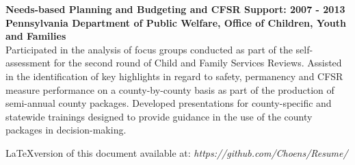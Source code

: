 \documentclass[line, margin, 10pt]{res}
\begin{document}
\begin{resume}
  {\bf Needs-based Planning and Budgeting and CFSR Support: 2007 - 2013} \\
  {\bf Pennsylvania Department of Public Welfare, Office of Children,
    Youth and Families} \\
  Participated in the analysis of focus groups conducted as part of
  the self-assessment for the second round of Child and Family
  Services Reviews.  Assisted in the identification of key highlights
  in regard to safety, permanency and CFSR measure performance on a
  county-by-county basis as part of the production of semi-annual
  county packages.  Developed presentations for county-specific and
  statewide trainings designed to provide guidance in the use of the
  county packages in decision-making.

  \vspace{1in}
  \LaTeX version of this document available at: \emph{https://github.com/Choens/Resume/}

\end{resume}
\end{document}
